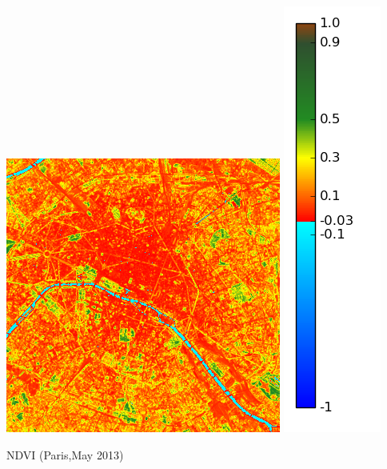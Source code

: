 \documentclass[c]{beamer}
\begin{document}
\begin{frame}
\begin{columns}
\begin{column}{0.33\textwidth}
\begin{overlayarea}{\linewidth}{2cm}
{  \includegraphics[scale=0.15]{images/Paris/05_ndvi.png}
  \includegraphics[scale=0.13]{images/colormap.png}
  }
  \end{overlayarea}
  \begin{overlayarea}{\linewidth}{0.5cm}
  \centering
  \tiny NDVI (Paris,May 2013) \par
  \end{overlayarea}
 \end{column}
 \begin{column}{0.33\textwidth}

\end{column}
\end{columns}
\end{frame}
\end{document}
